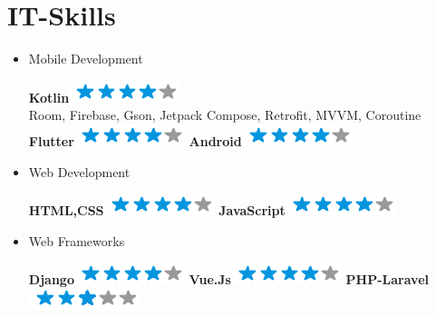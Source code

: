 \documentclass[]{friggeri-cv}
\begin{document}
\section{IT-Skills}
        \vspace*{-0.45cm}
        \setlength{\columnsep}{-0.3cm}
        \begin{flushright}
        \begin{multicols}{3}
		\begin{itemize}
		
		\setlength{\itemsep}{1pt}
  		\setlength{\parskip}{0pt}
  		\setlength{\parsep}{0pt}
          
        
\item Mobile Development \
\begin{flushright}

\textbf{Kotlin}\includegraphics[scale=0.40]{res/img/4stars.png}\\Room, Firebase, Gson, Jetpack Compose, Retrofit, MVVM, Coroutine\\\vspace{2mm}
\textbf{Flutter}\includegraphics[scale=0.40]{res/img/4stars.png}
\textbf{Android}\includegraphics[scale=0.40]{res/img/4stars.png}
\end{flushright}            

\item Web Development \
\begin{flushright}

\textbf{HTML,CSS}\includegraphics[scale=0.40]{res/img/4stars.png}
\textbf{JavaScript}\includegraphics[scale=0.40]{res/img/4stars.png}
\end{flushright}            

\item Web Frameworks \
\begin{flushright}

\textbf{Django}\includegraphics[scale=0.40]{res/img/4stars.png}
\textbf{Vue.Js}\includegraphics[scale=0.40]{res/img/4stars.png}
\textbf{PHP-Laravel}\includegraphics[scale=0.40]{res/img/3stars.png}
\end{flushright}            


\end{itemize}
\end{multicols}
\end{flushright}
\end{document}

